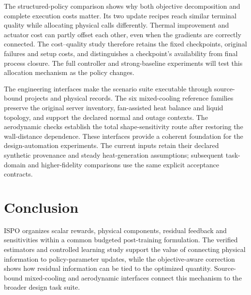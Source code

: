 The structured-policy comparison shows why both objective decomposition and complete execution costs matter. Its two update recipes reach similar terminal quality while allocating physical calls differently. Thermal improvement and actuator cost can partly offset each other, even when the gradients are correctly connected. The cost--quality study therefore retains the fixed checkpoints, original failures and setup costs, and distinguishes a checkpoint's availability from final process closure. The full controller and strong-baseline experiments will test this allocation mechanism as the policy changes.

The engineering interfaces make the scenario suite executable through source-bound projects and physical records. The six mixed-cooling reference families preserve the original server inventory, fan-assisted heat balance and liquid topology, and support the declared normal and outage contexts. The aerodynamic checks establish the total shape-sensitivity route after restoring the wall-distance dependence. These interfaces provide a coherent foundation for the design-automation experiments. The current inputs retain their declared synthetic provenance and steady heat-generation assumptions; subsequent task-domain and higher-fidelity comparisons use the same explicit acceptance contracts.


\section{Conclusion}
ISPO organizes scalar rewards, physical components, residual feedback and sensitivities within a common budgeted post-training formulation. The verified estimators and controlled learning study support the value of connecting physical information to policy-parameter updates, while the objective-aware correction shows how residual information can be tied to the optimized quantity. Source-bound mixed-cooling and aerodynamic interfaces connect this mechanism to the broader design task suite.
